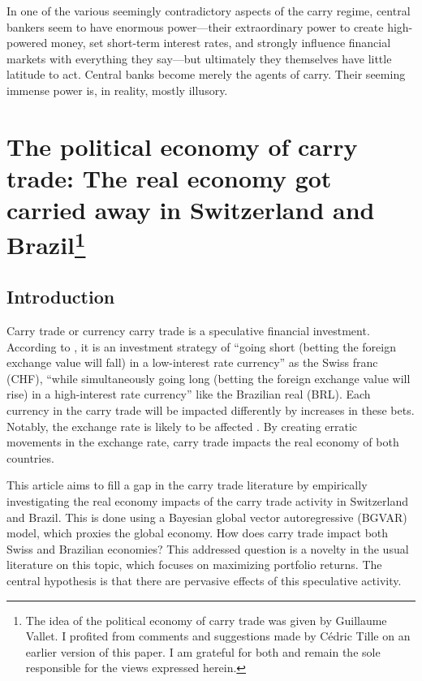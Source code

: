 \documentclass[a4paper, twoside]{templates/ociamthesis}
\begin{document}
\begin{savequote}
In one of the various seemingly contradictory aspects of the carry
regime, central bankers seem to have enormous power---their
extraordinary power to create high-powered money, set short-term
interest rates, and strongly influence financial markets with everything
they say---but ultimately they themselves have little latitude to act.
Central banks become merely the agents of carry. Their seeming immense
power is, in reality, mostly illusory.
\end{savequote}



\hypertarget{five}{%
\chapter[The political economy of carry trade: The real economy got carried away in Switzerland and Brazil]{\texorpdfstring{The political economy of carry trade: The real economy got carried away in Switzerland and Brazil\footnote{The idea of the political economy of carry trade was given by Guillaume Vallet. I profited from comments and suggestions made by Cédric Tille on an earlier version of this paper. I am grateful for both and remain the sole responsible for the views expressed herein.}}{The political economy of carry trade: The real economy got carried away in Switzerland and Brazil}}\label{five}}

\minitoc 

\hypertarget{fiveone}{%
\section{Introduction}\label{fiveone}}

\noindent Carry trade or currency carry trade is a speculative financial investment. According to \textcite[ 40]{frankel2008}, it is an investment strategy of ``going short (betting the foreign exchange value will fall) in a low-interest rate currency'' as the Swiss franc (CHF), ``while simultaneously going long (betting the foreign exchange value will rise) in a high-interest rate currency'' like the Brazilian real (BRL). Each currency in the carry trade will be impacted differently by increases in these bets. Notably, the exchange rate is likely to be affected \autocite{klitgaard2004,fong2013}. By creating erratic movements in the exchange rate, carry trade impacts the real economy of both countries.

This article aims to fill a gap in the carry trade literature by empirically investigating the real economy impacts of the carry trade activity in Switzerland and Brazil. This is done using a Bayesian global vector autoregressive (BGVAR) model, which proxies the global economy. How does carry trade impact both Swiss and Brazilian economies? This addressed question is a novelty in the usual literature on this topic, which focuses on maximizing portfolio returns. The central hypothesis is that there are pervasive effects of this speculative activity.
\end{document}
